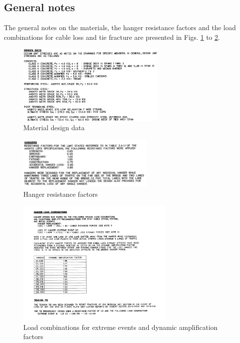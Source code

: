 \subsection{General notes} \label{app:general_notes}
The general notes on the materials, the hanger resistance factors and the load combinations for cable loss and tie fracture are presented in Figs. \ref{fig:materials} to \ref{fig:hanger_load_combination}.
\begin{figure}[H]
    \centering
    \includegraphics[width=0.65\textwidth]{overleaf/Appendix/Design drawings/Material design data.png}
    \caption{Material design data}
    \label{fig:materials}
\end{figure}
\begin{figure}[H]
    \centering
    \includegraphics[trim={0 0.9cm 0 0cm},clip, width=0.6\textwidth]{overleaf/Appendix/Design drawings/Hanger resistance factor.PNG}
    \caption{Hanger resistance factors}
\end{figure}
\begin{figure}[H]
    \centering
    \includegraphics[trim={0 0.5cm 0 0.7cm},clip, width=0.69\textwidth]{overleaf/Appendix/Design drawings/Hanger load combination.png}
    \caption{Load combinations for extreme events and dynamic amplification factors}
    \label{fig:hanger_load_combination}
\end{figure}

